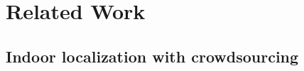 \documentclass[10pt,conference,compsocconf,letterpaper]{IEEEtran}
\begin{document}
\section{Related Work \label{sectionrelatedwork}}
\subsection{Indoor localization with crowdsourcing}


\end{document}
